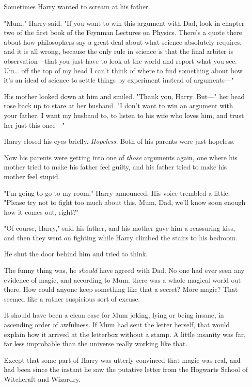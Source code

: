 Sometimes Harry wanted to scream at his father.

"Mum," Harry said. "If you want to win this argument with Dad, look in chapter
two of the first book of the Feynman Lectures on Physics. There's a quote there
about how philosophers say a great deal about what science absolutely requires,
and it is all wrong, because the only rule in science is that the final arbiter
is observation---that you just have to look at the world and report what you
see. Um{\ldots} off the top of my head I can't think of where to find something
about how it's an ideal of science to settle things by experiment instead of
arguments---"

His mother looked down at him and smiled. "Thank you, Harry. But---" her head
rose back up to stare at her husband. "I don't want to win an argument with
your father. I want my husband to, to listen to his wife who loves him, and
trust her just this once---"

Harry closed his eyes briefly. \emph{Hopeless.} Both of his parents were just
hopeless.

Now his parents were getting into one of \emph{those} arguments again, one
where his mother tried to make his father feel guilty, and his father tried to
make his mother feel stupid.

"I'm going to go to my room," Harry announced. His voice trembled a little.
"Please try not to fight too much about this, Mum, Dad, we'll know soon enough
how it comes out, right?"

"Of course, Harry," said his father, and his mother gave him a reassuring kiss,
and then they went on fighting while Harry climbed the stairs to his bedroom.

He shut the door behind him and tried to think.

The funny thing was, he \emph{should} have agreed with Dad. No one had ever
seen any evidence of magic, and according to Mum, there was a whole magical
world out there. How could anyone keep something like that a secret? More
magic? That seemed like a rather suspicious sort of excuse.

It should have been a clean case for Mum joking, lying or being insane, in
ascending order of awfulness. If Mum had sent the letter herself, that would
explain how it arrived at the letterbox without a stamp. A little insanity was
far, far less improbable than the universe really working like that.

Except that some part of Harry was utterly convinced that magic was real, and
had been since the instant he saw the putative letter from the Hogwarts School
of Witchcraft and Wizardry.

